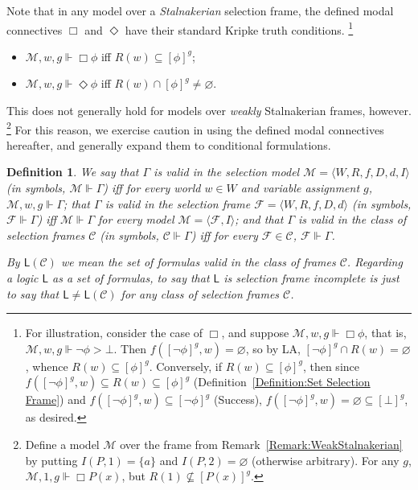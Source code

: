 \documentclass[12pt]{article}
\newtheorem{definition}{Definition}
\newcommand{\tup}[1]{\langle #1 \rangle}
\newcommand{\would}{\mathbin{>}}
\newcommand{\nec}{\mathop{\Box}}
\newcommand{\pos}{\mathop{\Diamond}}
\begin{document}

Note that in any model over a \emph{Stalnakerian} selection frame, the defined modal connectives $\nec$ and $\pos$ have their standard Kripke truth conditions.%
\footnote{
    For illustration, consider the case of $\nec$, and suppose $\mathcal{M},w,g \Vdash \nec\phi$, that is, $\mathcal{M},w,g \Vdash \neg\phi \would \bot$. 
    Then $f([\neg\phi]^{g},w)=\varnothing$, so by LA, $[\neg\phi]^{g}\cap R(w)=\varnothing$, whence $R(w)\subseteq [\phi]^{g}$. 
    Conversely, if $R(w)\subseteq[\phi]^{g}$, then since $f([\neg\phi]^{g},w)\subseteq R(w) \subseteq[\phi]^{g}$ (Definition~\ref{Definition:Set Selection Frame}) and $f([\neg\phi]^{g},w)\subseteq [\neg\phi]^g$ (Success), $f([\neg\phi]^{g},w)=\varnothing\subseteq [\bot]^{g}$, as desired.
    } %
\begin{itemize}
    \item[$\nec$.] $\mathcal{M},w,g \Vdash \nec\phi$ iff $R(w)\subseteq[\phi]^{g}$;
    \item[$\pos$.] $\mathcal{M},w,g \Vdash \pos\phi$ iff $R(w)\cap[\phi]^{g}\neq\varnothing$.
\end{itemize}
This does not generally hold for models over \emph{weakly} Stalnakerian frames, however.%
\footnote{
    Define a model $\mathcal{M}$ over the frame from Remark~\ref{Remark:WeakStalnakerian} by putting $I(P,1)=\{a\}$ and $I(P,2)=\varnothing$ (otherwise arbitrary). For any $g$, $\mathcal{M},1,g \Vdash \nec{P(x)}$, but $R(1)\not\subseteq[P(x)]^{g}$.
    } %
For this reason, we exercise caution in using the defined modal connectives hereafter, and generally expand them to conditional formulations.

\begin{definition}
\label{Definition:SelectionValidity}
    We say that $\Gamma$ is \emph{valid in the selection model} $\mathcal{M} = \tup{W,R,f,D,d,I}$ (in symbols, $\mathcal{M} \Vdash \Gamma$) iff for every world $w\in W$ and variable assignment $g$, $\mathcal{M},w,g \Vdash \Gamma$; that $\Gamma$ is \emph{valid in the selection frame} $\mathcal{F} = \tup{W,R,f,D,d}$ (in symbols, $\mathcal{F} \Vdash \Gamma$) iff $\mathcal{M} \Vdash \Gamma$ for every model $\mathcal{M} = \tup{\mathcal{F},I}$; and that $\Gamma$ is \emph{valid in the class of selection frames} $\mathcal{C}$ (in symbols, $\mathcal{C} \Vdash \Gamma$) iff for every $\mathcal{F}\in\mathcal{C}$, $\mathcal{F} \Vdash \Gamma$. 
    
    By $\mathsf{L}(\mathcal{C})$ we mean the set of formulas valid in the class of frames $\mathcal{C}$. Regarding a logic $\mathsf{L}$ as a set of formulas, to say that $\mathsf{L}$ is \emph{selection frame incomplete} is just to say that $\mathsf{L}\neq\mathsf{L}(\mathcal{C})$ for any class of selection frames $\mathcal{C}$. 
\end{definition}
\end{document}
